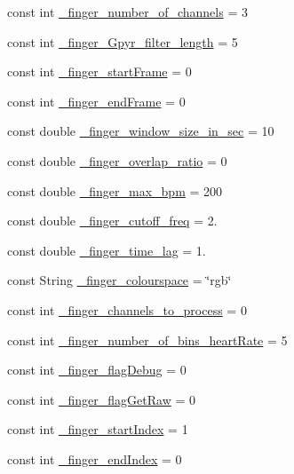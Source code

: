 \begin{DoxyCompactItemize}
const int \hyperlink{namespace_m_h_r_aa01f8308d2cb5cdb00c4a45de8a8cd5e}{\+\_\+finger\+\_\+number\+\_\+of\+\_\+channels} = 3
\item 
const int \hyperlink{namespace_m_h_r_a5b1bf691aa0c1246b140b3f67580c229}{\+\_\+finger\+\_\+\+Gpyr\+\_\+filter\+\_\+length} = 5
\item 
const int \hyperlink{namespace_m_h_r_a9b0e8542961b24a5dc2e1f77df715b51}{\+\_\+finger\+\_\+start\+Frame} = 0
\item 
const int \hyperlink{namespace_m_h_r_aab21e4fd871ccbbdfc656aa4d64aa688}{\+\_\+finger\+\_\+end\+Frame} = 0
\item 
const double \hyperlink{namespace_m_h_r_a04093f94b342ed569322ef2c3a5bcce2}{\+\_\+finger\+\_\+window\+\_\+size\+\_\+in\+\_\+sec} = 10
\item 
const double \hyperlink{namespace_m_h_r_a6ab2b5eaa5246621b9039b65e5501f1c}{\+\_\+finger\+\_\+overlap\+\_\+ratio} = 0
\item 
const double \hyperlink{namespace_m_h_r_ae15a1148a0dba9f30071db8315b9fe88}{\+\_\+finger\+\_\+max\+\_\+bpm} = 200
\item 
const double \hyperlink{namespace_m_h_r_a6125713b446a1bdd5bbc0fb9e75fc58e}{\+\_\+finger\+\_\+cutoff\+\_\+freq} = 2.
\item 
const double \hyperlink{namespace_m_h_r_ae2523999aef7718ac3e6edeb318edf8a}{\+\_\+finger\+\_\+time\+\_\+lag} = 1.
\item 
const String \hyperlink{namespace_m_h_r_af6ec9103edc4e3fe7011676f91c83c26}{\+\_\+finger\+\_\+colourspace} = \char`\"{}rgb\char`\"{}
\item 
const int \hyperlink{namespace_m_h_r_a16934905e88de3a2d084e6734948ec65}{\+\_\+finger\+\_\+channels\+\_\+to\+\_\+process} = 0
\item 
const int \hyperlink{namespace_m_h_r_a2762706b15a5accb61b7efa79cd0617a}{\+\_\+finger\+\_\+number\+\_\+of\+\_\+bins\+\_\+heart\+Rate} = 5
\item 
const int \hyperlink{namespace_m_h_r_aefc7157a4757a4b9017c968a17fb8ee1}{\+\_\+finger\+\_\+flag\+Debug} = 0
\item 
const int \hyperlink{namespace_m_h_r_a24fb7c804c7833388056a5e417354257}{\+\_\+finger\+\_\+flag\+Get\+Raw} = 0
\item 
const int \hyperlink{namespace_m_h_r_a25e5a8e8b0d72f6cfa98fa75e943f35e}{\+\_\+finger\+\_\+start\+Index} = 1
\item 
const int \hyperlink{namespace_m_h_r_a8b1ee45fde805239e5267fb0dcb03735}{\+\_\+finger\+\_\+end\+Index} = 0
\item 

\end{DoxyCompactItemize}
